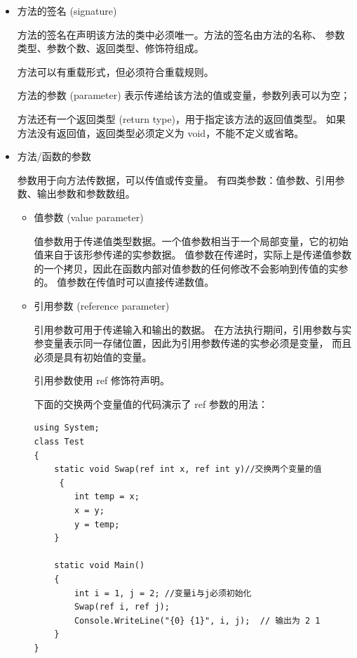 \begin{itemize}
    \item 方法的签名 (signature)

          方法的签名在声明该方法的类中必须唯一。方法的签名由方法的名称、
          参数类型、参数个数、返回类型、修饰符组成。

          方法可以有重载形式，但必须符合重载规则。

          方法的参数 (parameter) 表示传递给该方法的值或变量，参数列表可以为空；

          方法还有一个返回类型 (return type)，用于指定该方法的返回值类型。
          如果方法没有返回值，返回类型必须定义为 void，不能不定义或省略。

    \item 方法/函数的参数

          参数用于向方法传数据，可以传值或传变量。
          有四类参数：值参数、引用参数、输出参数和参数数组。

          \begin{itemize}
              \item 值参数 (value parameter)

                    值参数用于传递值类型数据。一个值参数相当于一个局部变量，它的初始值来自于该形参传递的实参数据。
                    值参数在传递时，实际上是传递值参数的一个拷贝，因此在函数内部对值参数的任何修改不会影响到传值的实参的。
                    值参数在传值时可以直接传递数值。

              \item 引用参数 (reference parameter)

                    引用参数可用于传递输入和输出的数据。
                    在方法执行期间，引用参数与实参变量表示同一存储位置，因此为引用参数传递的实参必须是变量，
                    而且必须是具有初始值的变量。

                    引用参数使用 ref 修饰符声明。

                    下面的交换两个变量值的代码演示了 ref 参数的用法：

                    \begin{lstlisting}
using System;
class Test
{
    static void Swap(ref int x, ref int y)//交换两个变量的值
     {
        int temp = x;
        x = y;
        y = temp;
    }

    static void Main()
    {
        int i = 1, j = 2; //变量i与j必须初始化
        Swap(ref i, ref j);
        Console.WriteLine("{0} {1}", i, j);  // 输出为 2 1
    }
}
\end{lstlisting}



\end{itemize}
\end{itemize}
